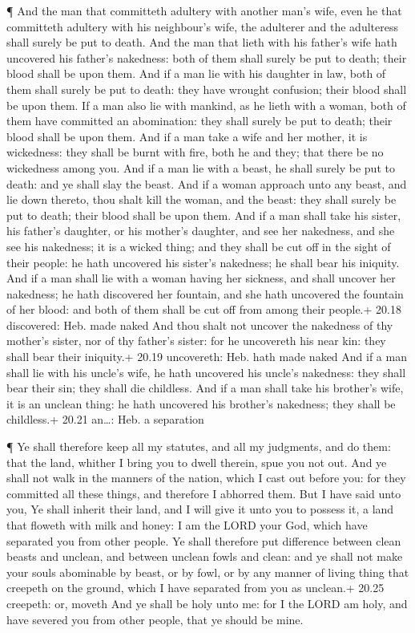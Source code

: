 ¶ And the man that committeth adultery with another man's
wife, even he that committeth adultery with his neighbour's wife, the
adulterer and the adulteress shall surely be put to death. 
And the man that lieth with his father's wife hath uncovered his
father's nakedness: both of them shall surely be put to death; their
blood shall be upon them.  And if a man lie with his
daughter in law, both of them shall surely be put to death: they have
wrought confusion; their blood shall be upon them.  If a
man also lie with mankind, as he lieth with a woman, both of them have
committed an abomination: they shall surely be put to death; their blood
shall be upon them.  And if a man take a wife and her
mother, it is wickedness: they shall be burnt with fire, both he and
they; that there be no wickedness among you.  And if a man
lie with a beast, he shall surely be put to death: and ye shall slay the
beast.  And if a woman approach unto any beast, and lie
down thereto, thou shalt kill the woman, and the beast: they shall
surely be put to death; their blood shall be upon them. 
And if a man shall take his sister, his father's daughter, or his
mother's daughter, and see her nakedness, and she see his nakedness; it
is a wicked thing; and they shall be cut off in the sight of their
people: he hath uncovered his sister's nakedness; he shall bear his
iniquity.  And if a man shall lie with a woman having her
sickness, and shall uncover her nakedness; he hath discovered her
fountain, and she hath uncovered the fountain of her blood: and both of
them shall be cut off from among their people.+ 20.18 discovered: Heb.
made naked  And thou shalt not uncover the nakedness of thy
mother's sister, nor of thy father's sister: for he uncovereth his near
kin: they shall bear their iniquity.+ 20.19 uncovereth: Heb. hath made
naked  And if a man shall lie with his uncle's wife, he
hath uncovered his uncle's nakedness: they shall bear their sin; they
shall die childless.  And if a man shall take his brother's
wife, it is an unclean thing: he hath uncovered his brother's nakedness;
they shall be childless.+ 20.21 an\ldots: Heb. a separation

 ¶ Ye shall therefore keep all my statutes, and all my
judgments, and do them: that the land, whither I bring you to dwell
therein, spue you not out.  And ye shall not walk in the
manners of the nation, which I cast out before you: for they committed
all these things, and therefore I abhorred them.  But I
have said unto you, Ye shall inherit their land, and I will give it unto
you to possess it, a land that floweth with milk and honey: I am the
LORD your God, which have separated you from other people. 
Ye shall therefore put difference between clean beasts and unclean, and
between unclean fowls and clean: and ye shall not make your souls
abominable by beast, or by fowl, or by any manner of living thing that
creepeth on the ground, which I have separated from you as unclean.+
20.25 creepeth: or, moveth  And ye shall be holy unto me:
for I the LORD am holy, and have severed you from other people, that ye
should be mine.

